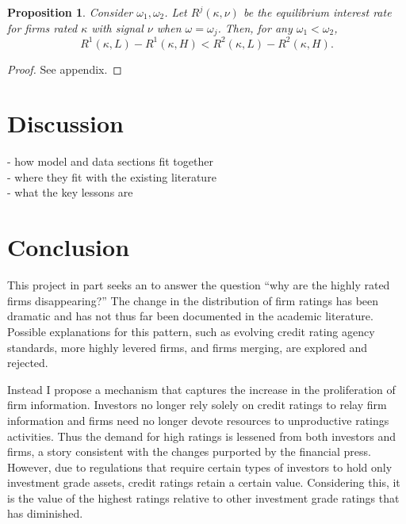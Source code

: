 \documentclass[titlepage]{article}
\newtheorem{proposition}{Proposition}
\begin{document}
\begin{proposition}
\label{pr:sprd}%
Consider $\omega_{1},\omega_{2}$. Let $R^{j}(\kappa,\nu)$ be the equilibrium interest rate for firms rated $\kappa$ with signal $\nu$ when $\omega=\omega_{j}$. Then, for any $\omega_{1}<\omega_{2}$,
\begin{equation*}
R^{1}(\kappa,L)-R^{1}(\kappa,H)<R^{2}(\kappa,L)-R^{2}(\kappa,H).
\end{equation*}
\end{proposition}

\begin{proof}
See appendix.
\end{proof}

\section{Discussion}
- how model and data sections fit together\\
- where they fit with the existing literature\\
- what the key lessons are

\section{Conclusion}
\label{sec:con}
This project in part seeks an to answer the question ``why are the highly rated firms disappearing?'' The change in the distribution of firm ratings has been dramatic and has not thus far been documented in the academic literature. Possible explanations for this pattern, such as evolving credit rating agency standards, more highly levered firms, and firms merging, are explored and rejected. 

Instead I propose a mechanism that captures the increase in the proliferation of firm information. Investors no longer rely solely on credit ratings to relay firm information and firms need no longer devote resources to unproductive ratings activities. Thus the demand for high ratings is lessened from both investors and firms, a story consistent with the changes purported by the financial press. However, due to regulations that require certain types of investors to hold only investment grade assets, credit ratings retain a certain value. Considering this, it is the value of the highest ratings relative to other investment grade ratings that has diminished.


\newpage

\nocite{*}


\end{document}
